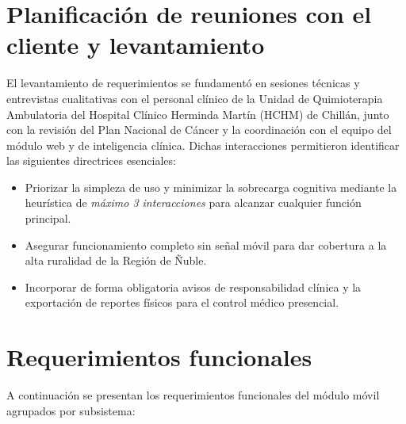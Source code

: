 \section{Planificación de reuniones con el cliente y levantamiento}
El levantamiento de requerimientos se fundamentó en sesiones técnicas y entrevistas cualitativas con el personal clínico de la Unidad de Quimioterapia Ambulatoria del Hospital Clínico Herminda Martín (HCHM) de Chillán, junto con la revisión del Plan Nacional de Cáncer y la coordinación con el equipo del módulo web y de inteligencia clínica. Dichas interacciones permitieron identificar las siguientes directrices esenciales:
\begin{itemize}
    \item Priorizar la simpleza de uso y minimizar la sobrecarga cognitiva mediante la heurística de \textit{máximo 3 interacciones} para alcanzar cualquier función principal.
    \item Asegurar funcionamiento completo sin señal móvil para dar cobertura a la alta ruralidad de la Región de Ñuble.
    \item Incorporar de forma obligatoria avisos de responsabilidad clínica y la exportación de reportes físicos para el control médico presencial.
\end{itemize}

\section{Requerimientos funcionales}

A continuación se presentan los requerimientos funcionales del módulo móvil agrupados por subsistema:

